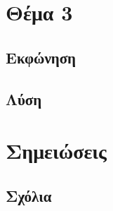 \documentclass[twocolumn]{report}
\begin{document}
% 
\chapter{Θέμα 3}
\section{Εκφώνηση}

\section{Λύση}


% 
\chapter{Σημειώσεις}
\section{Σχόλια}



\nocite{*} %


\end{document}
